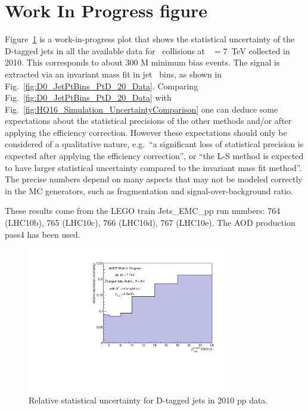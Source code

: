 \section{Work In Progress figure}
Figure~\ref{fig:HQ16_WorkInProgress_StatisticalUncertainty} is a work-in-progress plot that shows the statistical uncertainty 
of the D-tagged jets in all the available data for \pp\ collisions at \s~$=7$~TeV collected in 2010.
This corresponds to about 300 M minimum bias events. The signal is extracted via an invariant mass fit 
in jet \pt\ bins, as shown in Fig.~\ref{fig:D0_JetPtBins_PtD_20_Data}. 
Comparing Fig.~\ref{fig:D0_JetPtBins_PtD_20_Data} with Fig.~\ref{fig:HQ16_Simulation_UncertaintyComparison} one can
deduce some expectations about the statistical precisions of the other methods and/or after applying the efficiency correction.
However these expectations should only be considered of a qualitative nature, e.g.\ ``a significant loss of statistical precision
is expected after applying the efficiency correction'', or ``the L-S method is expected to have larger statistical uncertainty compared
to the invariant mass fit method''. The precise numbers depend on many aspects that may not be modeled correctly
in the MC generators, such as fragmentation and signal-over-background ratio.

These results come from the LEGO train Jets\_EMC\_pp run numbers: 764 (LHC10b),
765 (LHC10c), 766 (LHC10d), 767 (LHC10e). The AOD production pass4 has been used.
\begin{figure}[tbh]
\begin{center}
\includegraphics[width=0.8\textwidth]{img/HQ16_WorkInProgress_StatisticalUncertainty}
 \caption{Relative statistical uncertainty for D-tagged jets in 2010 pp data.} 
 \label{fig:HQ16_WorkInProgress_StatisticalUncertainty}
\end{center}
\end{figure}

